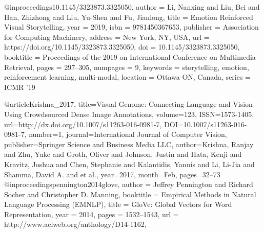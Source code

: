 @inproceedings{10.1145/3323873.3325050,
author = {Li, Nanxing and Liu, Bei and Han, Zhizhong and Liu, Yu-Shen and Fu, Jianlong},
title = {Emotion Reinforced Visual Storytelling},
year = {2019},
isbn = {9781450367653},
publisher = {Association for Computing Machinery},
address = {New York, NY, USA},
url = {https://doi.org/10.1145/3323873.3325050},
doi = {10.1145/3323873.3325050},
booktitle = {Proceedings of the 2019 on International Conference on Multimedia Retrieval},
pages = {297–305},
numpages = {9},
keywords = {storytelling, emotion, reinforcement learning, multi-modal},
location = {Ottawa ON, Canada},
series = {ICMR '19}
}

@article{Krishna_2017,
   title={Visual {G}enome: Connecting Language and Vision Using Crowdsourced Dense Image Annotations},
   volume={123},
   ISSN={1573-1405},
   url={http://dx.doi.org/10.1007/s11263-016-0981-7},
   DOI={10.1007/s11263-016-0981-7},
   number={1},
   journal={International Journal of Computer Vision},
   publisher={Springer Science and Business Media LLC},
   author={Krishna, Ranjay and Zhu, Yuke and Groth, Oliver and Johnson, Justin and Hata, Kenji and Kravitz, Joshua and Chen, Stephanie and Kalantidis, Yannis and Li, Li-Jia and Shamma, David A. and et al.},
   year={2017},
   month={Feb},
   pages={32–73}
}
@inproceedings{pennington2014glove,
  author = {Jeffrey Pennington and Richard Socher and Christopher D. Manning},
  booktitle = {Empirical Methods in Natural Language Processing (EMNLP)},
  title = {{GloVe}: Global Vectors for Word Representation},
  year = {2014},
  pages = {1532--1543},
  url = {http://www.aclweb.org/anthology/D14-1162},
}

